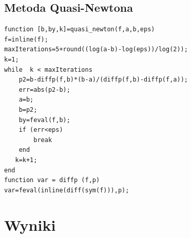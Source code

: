 \documentclass{classrep}
\begin{document}
\subsection{Metoda Quasi-Newtona}
\begin{lstlisting}
function [b,by,k]=quasi_newton(f,a,b,eps)
f=inline(f);
maxIterations=5+round((log(a-b)-log(eps))/log(2));
k=1;
while  k < maxIterations    
    p2=b-diffp(f,b)*(b-a)/(diffp(f,b)-diffp(f,a));    
    err=abs(p2-b);
    a=b;
    b=p2;
    by=feval(f,b);
    if (err<eps)
        break
    end
   k=k+1; 
end
function var = diffp (f,p)
var=feval(inline(diff(sym(f))),p);
\end{lstlisting}
\section{Wyniki}
	\begin{table}[H]
		\begin{center}
\begin{tabular}{|c|c|c|c|c|c|c|c|}


\end{tabular}
\end{center}
\end{table}
\end{document}
